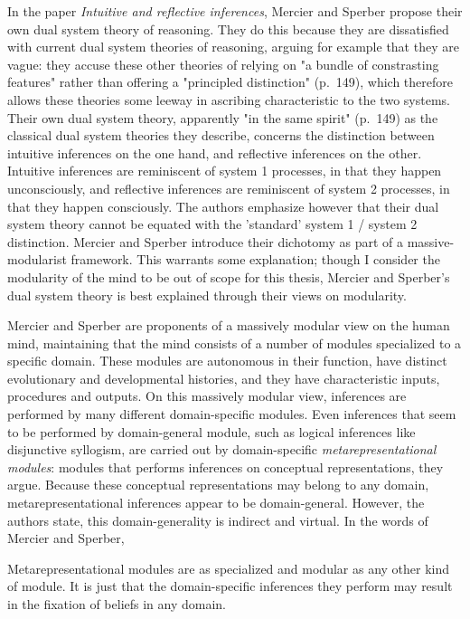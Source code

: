 In the \citeyear{MS09} paper \emph{Intuitive and reflective inferences}, Mercier and Sperber propose their own dual system theory of reasoning. They do this because they are dissatisfied with current dual system theories of reasoning, arguing for example that they are vague: they accuse these other theories of relying on "a bundle of constrasting features" rather than offering a "principled distinction" (p.~149), which therefore allows these theories some leeway in ascribing characteristic to the two systems.
Their own dual system theory, apparently "in the same spirit" (p.~149) as the classical dual system theories they describe, concerns the distinction between intuitive inferences on the one hand, and reflective inferences on the other.
Intuitive inferences are reminiscent of system 1 processes, in that they happen unconsciously, and reflective inferences are reminiscent of system 2 processes, in that they happen consciously.
The authors emphasize however that their dual system theory cannot be equated with the 'standard' system 1 / system 2 distinction.
Mercier and Sperber introduce their dichotomy as part of a massive-modularist framework. This warrants some explanation; though I consider the modularity of the mind to be out of scope for this thesis, Mercier and Sperber's dual system theory is best explained through their views on modularity.

Mercier and Sperber are proponents of a massively modular view on the human mind, maintaining that the mind consists of a number of modules specialized to a specific domain. These modules are autonomous in their function, have distinct evolutionary and developmental histories, and they have characteristic inputs, procedures and outputs.
On this massively modular view, inferences are performed by many different domain-specific modules. Even inferences that seem to be performed by domain-general module, such as logical inferences like disjunctive syllogism, are carried out by domain-specific \emph{metarepresentational modules}: modules that performs inferences on conceptual representations, they argue.
Because these conceptual representations may belong to any domain, metarepresentational inferences appear to be domain-general. However, the authors state, this domain-generality is indirect and virtual. In the words of Mercier and Sperber,
\begin{quoting}
    Metarepresentational modules are as specialized and modular as any other kind of module. It is just that the domain-specific inferences they perform may result in the fixation of beliefs in any domain.
    \hfill \citep[p.~153]{MS09}
\end{quoting}

